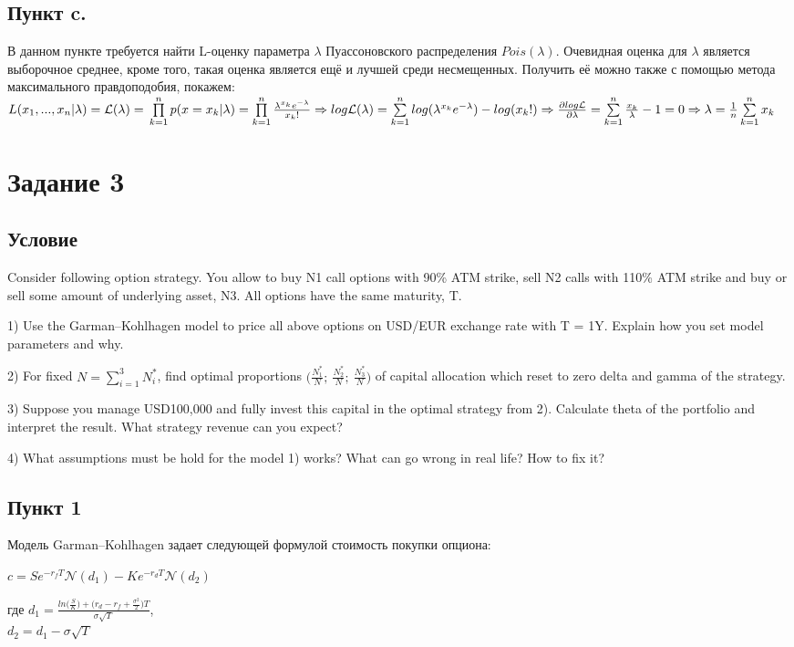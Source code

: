 \documentclass[a4paper]{article}
\theoremstyle{definition}
\begin{document}
\subsection{Пункт c.}
    В данном пункте требуется найти L-оценку параметра $\lambda$ Пуассоновского распределения $Pois(\lambda)$. Очевидная оценка для $\lambda$ является выборочное среднее, кроме того, такая оценка является ещё и лучшей среди несмещенных. 
    Получить её можно также с помощью метода максимального правдоподобия, покажем: $L(x_1, ..., x_n | \lambda) = \mathcal{L}(\lambda) = \\ 
    \prod\limits_{k=1}^n p(x = x_k| \lambda) = \prod\limits_{k=1}^{n} \frac{\lambda^{x_k}e^{-\lambda}}{x_k!} \Rightarrow log\mathcal{L}(\lambda) = \sum\limits_{k=1}^{n} log(\lambda^{x_{k}}e^{-\lambda}) - log(x_k!) \Rightarrow 
    \frac{\partial log\mathcal{L}}{\partial \lambda} = \sum\limits_{k=1}^n \frac{x_k}{\lambda} - 1 = 0 \Rightarrow \lambda = \frac{1}{n}\sum\limits_{k=1}^n x_k$ 

\section{Задание 3}
\subsection{Условие}
Consider following option strategy. You allow to buy N1 call options with 90\% ATM strike, 
sell N2 calls with 110\% ATM strike and buy or sell some amount of underlying asset, N3. 
All options have the same maturity, T.

1) Use the Garman–Kohlhagen model to price all above options on USD/EUR exchange rate with T = 1Y.
Explain how you set model parameters and why.

2) For fixed $N = \sum\limits_{i=1}^3 N^*_i$, find optimal proportions $\Big(\frac{N_1^*}{N}; \ \frac{N_2^*}{N}; \ \frac{N_3^*}{N} \Big)$ of capital allocation which reset to zero delta and gamma of the strategy.

3) Suppose you manage USD100,000 and fully invest this capital in the optimal strategy from 2). Calculate
theta of the portfolio and interpret the result. What strategy revenue can you expect?

4) What assumptions must be hold for the model 1) works? What can go wrong in real life? How to fix it?
    
\subsection{Пункт 1}
    Модель Garman–Kohlhagen задает следующей формулой стоимость покупки опциона: \\
    \begin{center}
        $c = S e^{-r_f T} \mathcal{N}(d_1) - K e^{-r_d T} \mathcal{N}(d_2)$
    \end{center}
    где $d_1 = \frac{ln\big(\frac{S}{K}\big) + \big(r_d - r_f + \frac{\sigma^2}{2}\big)T}{\sigma\sqrt{T}}$, \\
    $d_2 = d_1 - \sigma\sqrt{T}$
    
\end{document}
